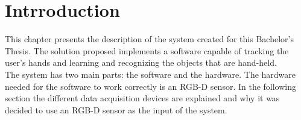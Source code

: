 \chapter*{Intrroduction}

This chapter presents the description of the system created for this Bachelor's Thesis. The solution proposed implements a software capable of tracking the user's hands and learning and recognizing the objects that are hand-held. 
\\
The system has two main parts: the software and the hardware. 
The hardware needed for the software to work correctly is an RGB-D sensor. In the following section the different data acquisition devices are explained and why it was decided to use an RGB-D sensor as the input of the system. 

 
